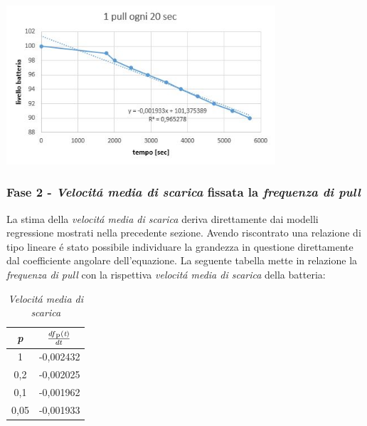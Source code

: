\documentclass{article}
\begin{document}
\begin{center}
\includegraphics[width=0.75\textwidth]{20alsec.jpg} %
\label{fig:1 pull ogni 20 secondi}
\end{center}


\subsubsection{Fase 2 - \textit{Velocit\'a media di scarica} fissata la \textit{frequenza di pull}}

La stima della \textit{velocit\'a media di scarica} deriva direttamente dai modelli regressione mostrati nella precedente sezione. Avendo riscontrato una relazione di tipo lineare \'e stato possibile individuare la grandezza in questione direttamente dal coefficiente angolare dell'equazione. La seguente tabella mette in relazione la \textit{frequenza di pull} con la rispettiva \textit{velocit\'a media di scarica} della batteria:

\begin{center} \begin{table}[h] \centering \begin{tabular}{cc} \textit{p} & \(\frac{df\textsubscript{p}(\textit{t})}{dt}\) \\ \hline \multicolumn{1}{|c|}{1} & \multicolumn{1}{c|}{-0,002432} \\ \hline \multicolumn{1}{|c|}{0,2} & \multicolumn{1}{c|}{-0,002025} \\ \hline \multicolumn{1}{|c|}{0,1} & \multicolumn{1}{c|}{-0,001962} \\ \hline \multicolumn{1}{|c|}{0,05} & \multicolumn{1}{c|}{-0,001933} \\ \hline \end{tabular} \caption{\textit{Velocit\'a media di scarica}} \label{my-label} \end{table} \end{center}
\end{document}
